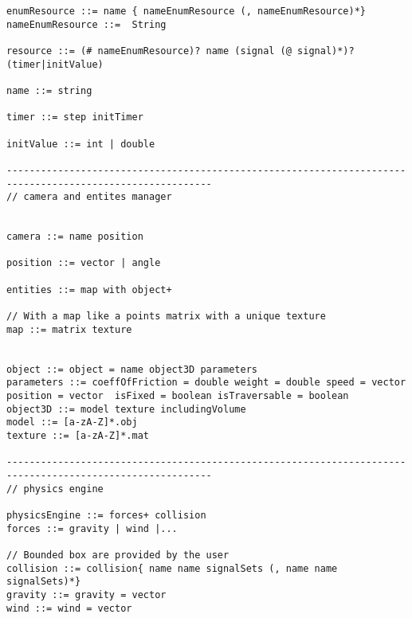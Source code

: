 \begin{lstlisting}[language=Grammar]
enumResource ::= name { nameEnumResource (, nameEnumResource)*}
nameEnumResource ::=  String

resource ::= (# nameEnumResource)? name (signal (@ signal)*)? (timer|initValue)

name ::= string

timer ::= step initTimer

initValue ::= int | double

----------------------------------------------------------------------------------------------------------
// camera and entites manager


camera ::= name position

position ::= vector | angle

entities ::= map with object+

// With a map like a points matrix with a unique texture
map ::= matrix texture


object ::= object = name object3D parameters
parameters ::= coeffOfFriction = double weight = double speed = vector position = vector  isFixed = boolean isTraversable = boolean
object3D ::= model texture includingVolume
model ::= [a-zA-Z]*.obj
texture ::= [a-zA-Z]*.mat

----------------------------------------------------------------------------------------------------------
// physics engine

physicsEngine ::= forces+ collision
forces ::= gravity | wind |...

// Bounded box are provided by the user
collision ::= collision{ name name signalSets (, name name signalSets)*}
gravity ::= gravity = vector
wind ::= wind = vector


\end{lstlisting}
